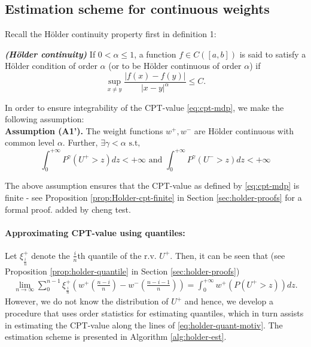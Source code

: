 \documentclass[11pt,letterpaper,english]{article}
\begin{document}
\subsection{Estimation scheme for \holder continuous weights}
Recall the H\"{o}lder continuity property first in definition 1:
\begin{definition}
{\textbf{\textit{(H\"{o}lder continuity)}}}
If $0 < \alpha \leq 1$, a function $f \in C([a,b])$ is said to satisfy
a H\"{o}lder condition of order $\alpha$ (or to be H\"{o}lder continuous
of order $\alpha$) if
\[
\sup_{x \neq y} \frac{| f(x) - f(y) |}{| x-y |^{\alpha}} \leq C .
\]
\end{definition}

In order to ensure integrability of the CPT-value \eqref{eq:cpt-mdp}, we make the following assumption:\\[1ex]
\textbf{Assumption (A1').}  
The weight functions $w^+, w^-$ are H\"{o}lder continuous with common level $\alpha$. Further,
$\exists \gamma < \alpha \text{   s.t,  }$ 
$$\int_0^{+\infty} P^{\gamma} (U^+>z) dz < +\infty \text{ and }\int_0^{+\infty} P^{\gamma} (U^->z) dz < +\infty$$

The above assumption ensures that the CPT-value as defined by \eqref{eq:cpt-mdp} is finite - see Proposition \ref{prop:Holder-cpt-finite} in Section \ref{sec:holder-proofs} for a formal proof.
added by cheng test.
\paragraph{Approximating CPT-value using quantiles:}
Let $\xi^+_{\frac{i}{n}}$ denote the $\frac{i}{n}$th quantile of the r.v. $U^+$. Then, it can be seen that (see Proposition \ref{prop:holder-quantile} in Section \ref{sec:holder-proofs})
\begin{align}
\label{eq:holder-quant-motiv}
\lim_{n \rightarrow \infty} \sum_0^{n-1} \xi^+_{\frac{i}{n}} \left(w^+\left(\frac{n-i}{n}\right)- w^-\left(\frac{n-i-1}{n}\right) \right) = \int_0^{+\infty} w^+(P(U^+>z)) dz.
\end{align}
However, we do not know the distribution of $U^+$ and hence, we develop a procedure that uses order statistics for estimating quantiles, which in turn assists in estimating the CPT-value along the lines of \eqref{eq:holder-quant-motiv}. The estimation scheme is presented in Algorithm \ref{alg:holder-est}.
\end{document}
